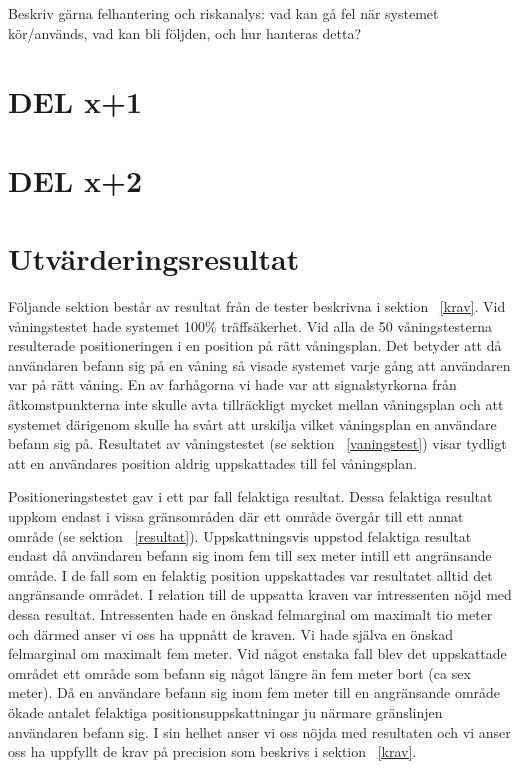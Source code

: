 \documentclass[a4paper,12pt]{article}
\begin{document}
 Beskriv gärna felhantering och riskanalys: vad kan gå fel när systemet kör/används, vad kan bli följden, och hur hanteras detta?

 \section{DEL x+1}
 \section{DEL x+2}

 \fi

 \section{Utvärderingsresultat}\label{utvarderingsresultat}

 Följande sektion består av resultat från de tester beskrivna i sektion ~\ref{krav}.
 Vid våningstestet hade systemet 100\% träffsäkerhet. Vid alla de 50 våningstesterna resulterade positioneringen i en position på rätt våningsplan. Det betyder att då användaren befann sig på en våning så visade systemet varje gång att användaren var på rätt våning. En av farhågorna vi hade var att signalstyrkorna från åtkomstpunkterna inte skulle avta tillräckligt mycket mellan våningsplan och att systemet därigenom skulle ha svårt att urskilja vilket våningsplan en användare befann sig på. Resultatet av våningstestet (se sektion ~\ref{vaningstest}) visar tydligt att en användares position aldrig uppskattades till fel våningsplan.

 Positioneringstestet gav i ett par fall felaktiga resultat. Dessa felaktiga resultat uppkom endast i vissa gränsområden där ett område övergår till ett annat område (se sektion ~\ref{resultat}). Uppskattningsvis uppstod felaktiga resultat endast då användaren befann sig inom fem till sex meter intill ett angränsande område. I de fall som en felaktig position uppskattades var resultatet alltid det angränsande området. I relation till de uppsatta kraven var intressenten nöjd med dessa resultat. Intressenten hade en önskad felmarginal om maximalt tio meter och därmed anser vi oss ha uppnått de kraven. Vi hade själva en önskad felmarginal om maximalt fem meter. Vid något enstaka fall blev det uppskattade området ett område som befann sig något längre än fem meter bort (ca sex meter). Då en användare befann sig inom fem meter till en angränsande område ökade antalet felaktiga positionsuppskattningar ju närmare gränslinjen användaren befann sig. I sin helhet anser vi oss nöjda med resultaten och vi anser oss ha uppfyllt de krav på precision som beskrivs i sektion ~\ref{krav}.
\end{document}
